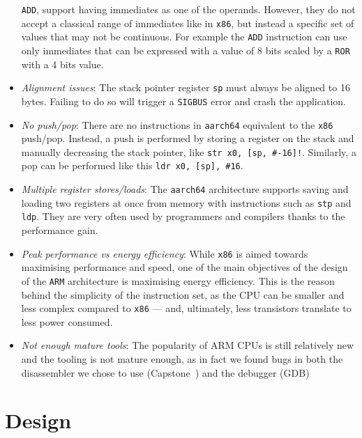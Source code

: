 \documentclass[a4paper,11pt,oneside]{report}
\begin{document}
\begin{itemize}
		\texttt{ADD}, support having immediates as one of the operands.  
		However, they do not accept a classical range of immediates like in 
		\texttt{x86}, but instead a specific set of values that may not be 
		continuous.  For example the \texttt{ADD} instruction can use only 
		immediates that can be expressed with a value of 8 bits scaled by a 
		\texttt{ROR} with a
		4 bits value.
	\item \emph{Alignment issues}: The stack pointer register \texttt{sp} must 
		always be aligned to 16 bytes. Failing to do so will trigger a 
		\texttt{SIGBUS} error and crash the application.
	\item \emph{No push/pop}: There are no instructions in \texttt{aarch64} 
		equivalent to the \texttt{x86} push/pop. Instead, a push is performed 
		by storing a register on the stack and manually decreasing the stack 
		pointer, like \verb|str x0, [sp, #-16]!|. Similarly, a pop can be 
		performed like this \verb|ldr x0, [sp], #16|.

	\item \emph{Multiple register stores/loads}: The \texttt{aarch64} 
		architecture supports saving and loading two registers at once from 
		memory with instructions such as \texttt{stp} and \texttt{ldp}. They 
		are very often used by programmers and compilers thanks to the 
		performance gain.

	\item \emph{Peak performance vs energy efficiency}: While \texttt{x86} is 
		aimed towards maximising performance and speed, one of the main 
		objectives of the design of the \texttt{ARM} architecture is maximising 
		energy efficiency. This is the reason behind the simplicity of the 
		instruction set, as the CPU can be smaller and less complex compared to 
		\texttt{x86} --- and, ultimately, less transistors translate to less 
		power consumed. 

	\item \emph{Not enough mature tools}: The popularity of ARM CPUs is still 
		relatively new and the tooling is not mature enough, as in fact we 
		found bugs in both the disassembler we chose to use 
		(Capstone~\cite{capstone}) and the debugger (GDB)
\end{itemize}


\chapter{Design}
\end{document}
